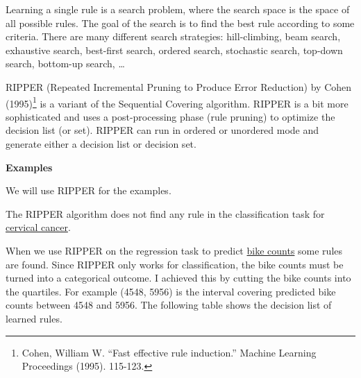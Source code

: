 \documentclass[
  11pt,
]{scrbook}
\begin{document}
Learning a single rule is a search problem, where the search space is the space of all possible rules.
The goal of the search is to find the best rule according to some criteria.
There are many different search strategies:
hill-climbing, beam search, exhaustive search, best-first search, ordered search, stochastic search, top-down search, bottom-up search, \ldots{}

RIPPER (Repeated Incremental Pruning to Produce Error Reduction) by Cohen (1995)\footnote{Cohen, William W. ``Fast effective rule induction.'' Machine Learning Proceedings (1995). 115-123.} is a variant of the Sequential Covering algorithm.
RIPPER is a bit more sophisticated and uses a post-processing phase (rule pruning) to optimize the decision list (or set).
RIPPER can run in ordered or unordered mode and generate either a decision list or decision set.

\textbf{Examples}

We will use RIPPER for the examples.

The RIPPER algorithm does not find any rule in the classification task for \protect\hyperlink{cervical}{cervical cancer}.

When we use RIPPER on the regression task to predict \protect\hyperlink{bike-data}{bike counts} some rules are found.
Since RIPPER only works for classification, the bike counts must be turned into a categorical outcome.
I achieved this by cutting the bike counts into the quartiles.
For example (4548, 5956) is the interval covering predicted bike counts between 4548 and 5956.
The following table shows the decision list of learned rules.
\end{document}
